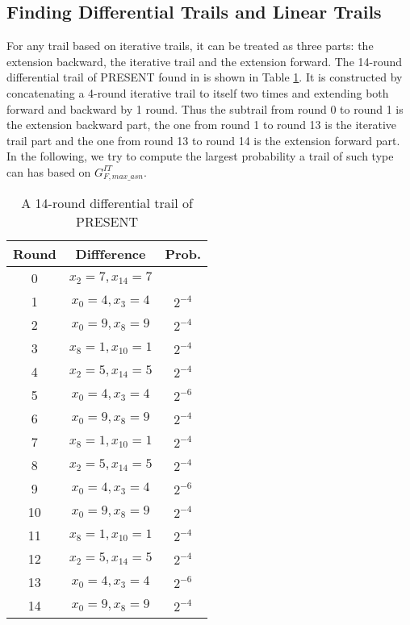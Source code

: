 \subsection{Finding Differential Trails and Linear Trails\label{subsec:find-trails}}

For any trail based on iterative trails, it can be treated as three parts: the extension backward, the iterative trail and the extension forward. The 14-round differential trail of PRESENT found in \cite{W08} is shown in Table \ref{tab:trail-present}. It is constructed by concatenating a 4-round iterative trail to itself two times and extending both forward and backward by 1 round. Thus the subtrail from round 0 to round 1 is the extension backward part, the one from round 1 to round 13 is the iterative trail part and the one from round 13 to round 14 is the extension forward part. In the following, we try to compute the largest probability a trail of such type can has based on $G^{IT}_{F,max\_asn}$. 

\begin{table}
	\caption{A 14-round differential trail of PRESENT}\label{tab:trail-present}
	\centering
	\begin{tabular}{|c|c|c|}
		\hline
		Round &  Diffference & Prob.\\
		\hline
		0 &  $x_2=7,x_{14}=7$ & \\
		1 &  $x_0=4,x_3=4$ & $2^{-4}$\\
		2 &  $x_0=9,x_8=9$ & $2^{-4}$\\
		3 &  $x_8=1,x_{10}=1$ & $2^{-4}$\\
		4 &  $x_2=5,x_{14}=5$ & $2^{-4}$\\
		5 &  $x_0=4,x_3=4$ & $2^{-6}$\\
		6 &  $x_0=9,x_8=9$ & $2^{-4}$\\
		7 &  $x_8=1,x_{10}=1$ & $2^{-4}$\\
		8 &  $x_2=5,x_{14}=5$ & $2^{-4}$\\
		9 &  $x_0=4,x_3=4$ & $2^{-6}$\\
		10 &  $x_0=9,x_8=9$ & $2^{-4}$\\
		11 &  $x_8=1,x_{10}=1$ & $2^{-4}$\\
		12 &  $x_2=5,x_{14}=5$ & $2^{-4}$\\
		13 &  $x_0=4,x_3=4$ & $2^{-6}$\\
		14 &  $x_0=9,x_8=9$ & $2^{-4}$\\
		\hline
	\end{tabular}
\end{table}

